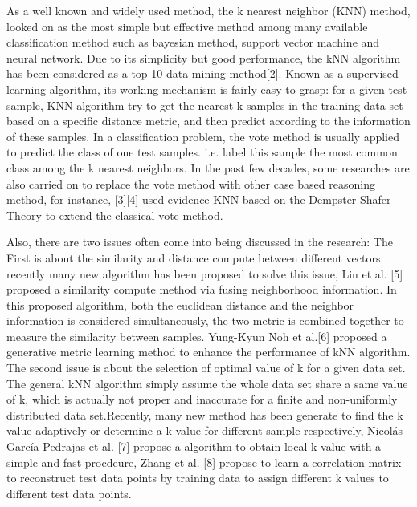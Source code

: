 \documentclass[runningheads]{llncs}
\begin{document}
As a well known and widely used method, the k nearest neighbor (KNN) method, looked on as the most simple but effective method among many available classification method such as bayesian method, support vector machine and neural network. Due to its simplicity but good performance, the kNN algorithm has been considered as a top-10 data-mining method[2]. Known as a supervised learning algorithm, its working mechanism is fairly easy to grasp: for a given test sample, KNN algorithm try to get the nearest k samples in the training data set based on a specific distance metric, and then predict according to the information of these samples. In a classification problem, the vote method is usually applied to predict the class of one test samples. i.e. label this sample the most common class among the k nearest neighbors. In the past few decades, some researches are also carried on to replace the vote method with other case based reasoning method, for instance, [3][4] used evidence KNN based on the Dempster-Shafer Theory to extend the classical vote method.

Also, there are two issues often come into being discussed in the research: The First is about the similarity and distance compute between different vectors. recently many new algorithm has been proposed to solve this issue, Lin et al. [5] proposed a similarity compute method via fusing neighborhood information. In this proposed algorithm, both the euclidean distance and the neighbor information is considered simultaneously, the two metric is combined together to measure the similarity between samples. Yung-Kyun Noh et al.[6] proposed a generative metric learning method to enhance the performance of kNN algorithm. The second issue is about the selection of optimal value of k for a given data set. The general kNN algorithm simply  assume the whole data set share a same value of k, which is actually not proper and inaccurate for a finite and non-uniformly distributed data set.Recently, many new method has been generate to find the k value adaptively or determine a k value for different sample respectively,  Nicolás García-Pedrajas et al. [7] propose a algorithm to obtain local k value with a simple and fast procdeure, Zhang et al. [8] propose to learn a correlation matrix to reconstruct test data points by training data to assign different k values to different test data points.
\end{document}
